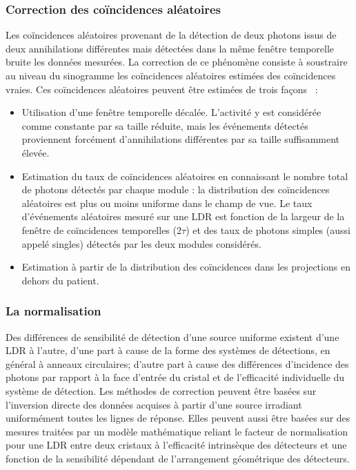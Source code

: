 \subsubsection{Correction des coïncidences aléatoires}
Les coïncidences aléatoires provenant de la détection de deux photons issus de deux annihilations différentes mais détectées dans la même fenêtre temporelle bruite les données mesurées. La correction de ce phénomène consiste à soustraire au niveau du sinogramme les coïncidences aléatoires estimées des coïncidences vraies. Ces coïncidences aléatoires peuvent être estimées de trois façons~\cite{brasse2005correction} :

\begin{itemize}
\item Utilisation d'une fenêtre temporelle décalée. L’activité y est considérée comme constante par sa taille réduite, mais les événements détectés proviennent forcément d’annihilations différentes par sa taille suffisamment élevée.
\item Estimation du taux de coïncidences aléatoires en connaissant le nombre total de photons détectés par chaque module : la distribution des coïncidences aléatoires est plus ou moins uniforme dans le champ de vue. Le taux d’événements aléatoires mesuré sur une LDR est fonction de la largeur de la fenêtre de coïncidences temporelles ($2\tau$) et des taux de photons simples (aussi appelé singles) détectés par les deux modules considérés.
\item Estimation à partir de la distribution des coïncidences dans les projections en dehors du patient.
\end{itemize}


\subsubsection{La normalisation}

Des différences de sensibilité de détection d’une source uniforme existent d’une LDR à l’autre, d’une part à cause de la forme des systèmes de détections, en général à anneaux circulaires; d’autre part à cause des différences d’incidence des photons par rapport à la face d’entrée du cristal et de l’efficacité individuelle du système de détection. Les méthodes de correction peuvent être basées sur l’inversion directe des données acquises à partir d’une source irradiant uniformément toutes les lignes de réponse. Elles peuvent aussi être basées sur des mesures traitées par un modèle mathématique reliant le facteur de normalisation pour une LDR entre deux cristaux à l’efficacité intrinsèque des détecteurs et une fonction de la sensibilité dépendant de l’arrangement géométrique des détecteurs.



